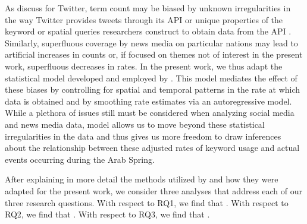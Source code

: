 As \cite{eisenstein_diffusion_2014} discuss for Twitter, term count may be biased by unknown irregularities in the way Twitter provides tweets through its API \citep{morstatter_is_2013} or unique properties of the keyword or spatial queries researchers construct to obtain data from the API \citep{joseph_approach_2014}.  Similarly, superfluous coverage by news media on particular nations may lead to artificial increases in counts or, if focused on themes not of interest in the present work, superfluous decreases in rates. In the present work, we thus adapt the statistical model developed and employed by \cite{eisenstein_diffusion_2014}. This model mediates the effect of these biases by controlling for spatial and temporal patterns in the rate at which data is obtained and by smoothing rate estimates via an autoregressive model. While a plethora of issues still must be considered when analyzing social media \citep{tufekci_big_2014} and news media \citep{} data,  model allows us to move beyond these statistical irregularities in the data and thus gives us more freedom to draw inferences about the relationship between these adjusted rates of keyword usage and actual events occurring during the Arab Spring.

After explaining in more detail the methods utilized by \cite{eisenstein_diffusion_2014} and how they were adapted for the present work, we consider three analyses that address each of our three research questions.  With respect to RQ1, we find that . With respect to RQ2, we find that . With respect to RQ3, we find that .




